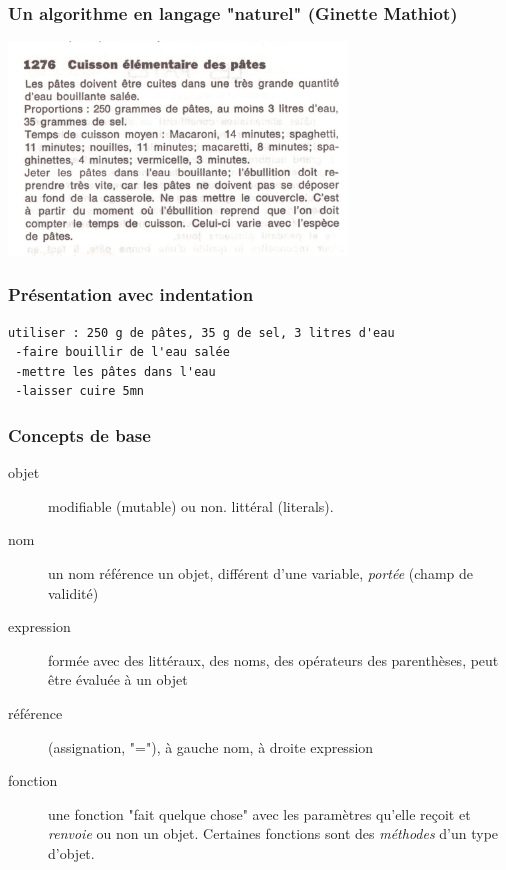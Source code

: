 


\begin{frame}
\frametitle{Un algorithme en langage "naturel" (Ginette Mathiot)}
 \includegraphics[width=9cm]{introalgo_1.png}  
\end{frame}

\begin{frame}[fragile]
  \frametitle{Présentation avec indentation}
\begin{verbatim}
utiliser : 250 g de pâtes, 35 g de sel, 3 litres d'eau
 -faire bouillir de l'eau salée
 -mettre les pâtes dans l'eau
 -laisser cuire 5mn
\end{verbatim} 
\end{frame}

\begin{frame}
  \frametitle{Concepts de base}
  \begin{description}
 \item[objet] modifiable (mutable) ou non. littéral (literals).
  \item[nom] un nom référence un objet, différent d'une variable, \emph{portée} (champ de validité)
 \item[expression] formée avec des littéraux, des noms, des opérateurs des parenthèses, peut être évaluée à un objet
 \item[référence] (assignation, "="),  à gauche nom,  à droite expression
 \item[fonction] une fonction "fait quelque chose" avec les paramètres qu'elle reçoit et \emph{renvoie} ou non un objet. Certaines fonctions sont des \emph{méthodes} d'un type d'objet.
\end{description}
\end{frame}

